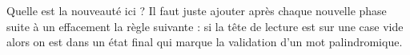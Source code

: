 \begin{multicols}{2}

\emptybox\emptybox%
	\emptybox\emptybox{}\emptybox\emptybox%
\emptybox\emptybox

\phantom{%
	\emptybox\emptybox\emptybox\emptybox}%
	\head


\medskip %

\emptybox\emptybox%
	\emptybox\emptybox{}\emptybox\emptybox%
\emptybox\emptybox

\phantom{%
	\emptybox\emptybox%
	\emptybox\emptybox\emptybox\emptybox}%
	\head
	

\medskip

\emptybox\emptybox%
	\emptybox\emptybox\emptybox{}\emptybox\emptybox\emptybox%
\emptybox\emptybox

\phantom{%
	\emptybox\emptybox\emptybox\emptybox\emptybox}%
	\head
	

\vfill\null
\columnbreak



\emptybox\emptybox%
	\emptybox\emptybox\emptybox{}\emptybox\emptybox\emptybox%
\emptybox\emptybox

\phantom{%
	\emptybox\emptybox%
	\emptybox\emptybox\emptybox}%
	\head
	

\medskip

\emptybox\emptybox%
	\emptybox\emptybox\emptybox\emptybox\emptybox\emptybox\emptybox%
\emptybox\emptybox

\phantom{%
	\emptybox\emptybox\emptybox\emptybox\emptybox\emptybox}%
	\head

\vfill\null
\end{multicols}


\vspace{-1em}

Quelle est la nouveauté ici ? Il faut juste ajouter après chaque nouvelle phase suite à un effacement la règle suivante : si la tête de lecture est sur une case vide alors on est dans un état final qui marque la validation d'un mot palindromique.
